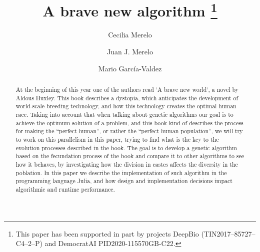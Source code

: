 \documentclass[runningheads]{llncs}
\begin{document}
%
\title{A brave new algorithm \thanks{This paper has been supported in part by projects DeepBio (TIN2017--85727--C4--2--P) and DemocratAI PID2020-115570GB-C22.}}
%
%
\author{Cecilia Merelo \and
Juan J. Merelo \and Mario Garc\'ia-Valdez
 }
%
%
%
\maketitle              %
%
\begin{abstract}

At the beginning of this year one of the authors read `A brave new
world`, a novel by Aldous Huxley.  This book describes a dystopia,
which anticipates the development of world-scale breeding technology,
and how this technology creates the optimal human race. Taking into
account that when talking about genetic algorithms our goal is to
achieve the optimum solution of a problem, and this book kind of
describes the process for making the “perfect human”, or rather the
``perfect human population'', we will try to work on this parallelism
in this paper, trying to find what is the key to the evolution
processes described in the book. The goal is to develop a genetic
algorithm based on the fecundation process of the book and compare it
to other algorithms to see how it behaves, by investigating how the
division in castes affects the diversity in the poblation. In this
paper we describe the implementation of such algorithm in the
programming language Julia, and how design and implementation
decisions impact algorithmic and runtime performance.

\end{abstract}










\end{document}
